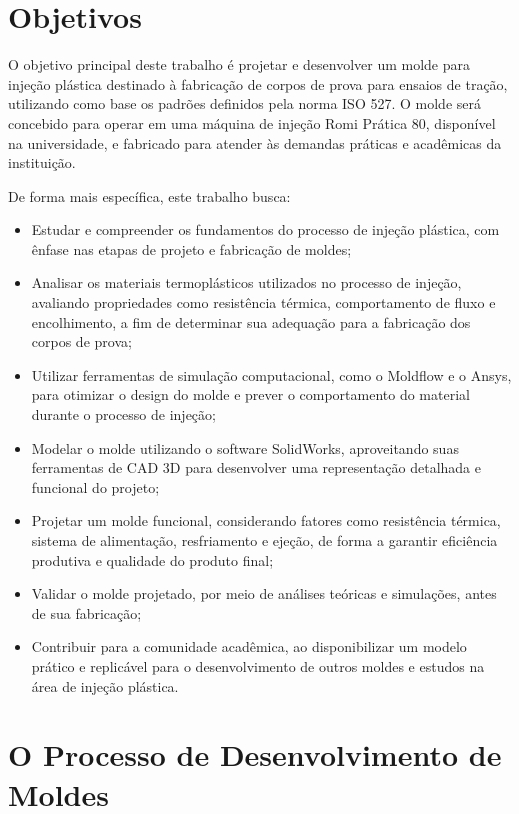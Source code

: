 \section{Objetivos}

O objetivo principal deste trabalho é projetar e desenvolver um molde para injeção plástica destinado à fabricação de corpos de prova para ensaios de tração, utilizando como base os padrões definidos pela norma ISO 527. O molde será concebido para operar em uma máquina de injeção Romi Prática 80, disponível na universidade, e fabricado para atender às demandas práticas e acadêmicas da instituição.

De forma mais específica, este trabalho busca:

\begin{itemize}
    \item Estudar e compreender os fundamentos do processo de injeção plástica, com ênfase nas etapas de projeto e fabricação de moldes;
    \item Analisar os materiais termoplásticos utilizados no processo de injeção, avaliando propriedades como resistência térmica, comportamento de fluxo e encolhimento, a fim de determinar sua adequação para a fabricação dos corpos de prova;
    \item Utilizar ferramentas de simulação computacional, como o Moldflow e o Ansys, para otimizar o design do molde e prever o comportamento do material durante o processo de injeção;
    \item Modelar o molde utilizando o software SolidWorks, aproveitando suas ferramentas de CAD 3D para desenvolver uma representação detalhada e funcional do projeto;
    \item Projetar um molde funcional, considerando fatores como resistência térmica, sistema de alimentação, resfriamento e ejeção, de forma a garantir eficiência produtiva e qualidade do produto final;
    \item Validar o molde projetado, por meio de análises teóricas e simulações, antes de sua fabricação;
    \item Contribuir para a comunidade acadêmica, ao disponibilizar um modelo prático e replicável para o desenvolvimento de outros moldes e estudos na área de injeção plástica.
\end{itemize}

\section{O Processo de Desenvolvimento de Moldes}

